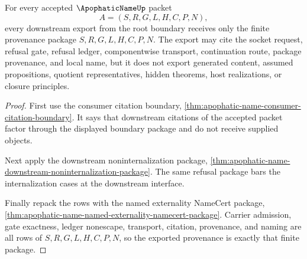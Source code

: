 \begin{theorem}
\label{thm:apophatic-name-root-boundary-provenance-export}
For every accepted $\ApophaticNameUp$ packet
$$
A=(S,R,G,L,H,C,P,N),
$$
every downstream export from the root boundary receives only the finite provenance package $S,R,G,L,H,C,P,N$. The export may cite the socket request, refusal gate, refusal ledger, componentwise transport, continuation route, package provenance, and local name, but it does not export generated content, assumed propositions, quotient representatives, hidden theorems, host realizations, or closure principles.
\end{theorem}
\begin{proof}
First use the consumer citation boundary, \autoref{thm:apophatic-name-consumer-citation-boundary}. It says that downstream citations of the accepted packet factor through the displayed boundary package and do not receive supplied objects.

Next apply the downstream noninternalization package, \autoref{thm:apophatic-name-downstream-noninternalization-package}. The same refusal package bars the internalization cases at the downstream interface.

Finally repack the rows with the named externality NameCert package, \autoref{thm:apophatic-name-named-externality-namecert-package}. Carrier admission, gate exactness, ledger nonescape, transport, citation, provenance, and naming are all rows of $S,R,G,L,H,C,P,N$, so the exported provenance is exactly that finite package.
\end{proof}

